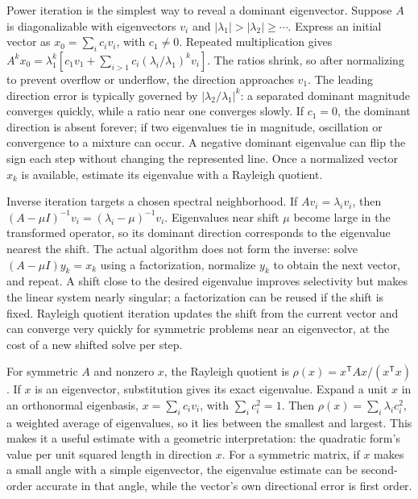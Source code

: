 Power iteration is the simplest way to reveal a dominant eigenvector. Suppose \(A\) is diagonalizable with eigenvectors \(v_i\) and \(|\lambda_1|>|\lambda_2|\ge\cdots\). Express an initial vector as \(x_0=\sum_i c_i v_i\), with \(c_1\ne0\). Repeated multiplication gives \(A^kx_0=\lambda_1^k[c_1v_1+\sum_{i>1}c_i(\lambda_i/\lambda_1)^kv_i]\). The ratios shrink, so after normalizing to prevent overflow or underflow, the direction approaches \(v_1\). The leading direction error is typically governed by \(|\lambda_2/\lambda_1|^k\): a separated dominant magnitude converges quickly, while a ratio near one converges slowly. If \(c_1=0\), the dominant direction is absent forever; if two eigenvalues tie in magnitude, oscillation or convergence to a mixture can occur. A negative dominant eigenvalue can flip the sign each step without changing the represented line. Once a normalized vector \(x_k\) is available, estimate its eigenvalue with a Rayleigh quotient.

Inverse iteration targets a chosen spectral neighborhood. If \(Av_i=\lambda_i v_i\), then \((A-\mu I)^{-1}v_i=(\lambda_i-\mu)^{-1}v_i\). Eigenvalues near shift \(\mu\) become large in the transformed operator, so its dominant direction corresponds to the eigenvalue nearest the shift. The actual algorithm does not form the inverse: solve \((A-\mu I)y_k=x_k\) using a factorization, normalize \(y_k\) to obtain the next vector, and repeat. A shift close to the desired eigenvalue improves selectivity but makes the linear system nearly singular; a factorization can be reused if the shift is fixed. Rayleigh quotient iteration updates the shift from the current vector and can converge very quickly for symmetric problems near an eigenvector, at the cost of a new shifted solve per step.

For symmetric \(A\) and nonzero \(x\), the Rayleigh quotient is \(\rho(x)=x^\mathsf TAx/(x^\mathsf Tx)\). If \(x\) is an eigenvector, substitution gives its exact eigenvalue. Expand a unit \(x\) in an orthonormal eigenbasis, \(x=\sum_i c_i v_i\), with \(\sum_i c_i^2=1\). Then \(\rho(x)=\sum_i\lambda_i c_i^2\), a weighted average of eigenvalues, so it lies between the smallest and largest. This makes it a useful estimate with a geometric interpretation: the quadratic form's value per unit squared length in direction \(x\). For a symmetric matrix, if \(x\) makes a small angle with a simple eigenvector, the eigenvalue estimate can be second-order accurate in that angle, while the vector's own directional error is first order.

